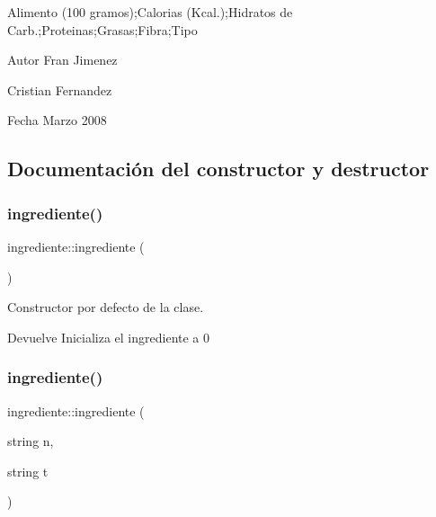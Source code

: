 Alimento (100 gramos);Calorias (Kcal.);Hidratos de Carb.;Proteinas;Grasas;Fibra;Tipo

\begin{DoxyAuthor}{Autor}
Fran Jimenez 

Cristian Fernandez 
\end{DoxyAuthor}
\begin{DoxyDate}{Fecha}
Marzo 2008 
\end{DoxyDate}


\subsection{Documentación del constructor y destructor}
\mbox{\label{classingrediente_a4f2c8e16106eb4cf5a8ad9695d7a3809}} 
\subsubsection{\texorpdfstring{ingrediente()}{ingrediente()}\hspace{0.1cm}{\footnotesize\ttfamily [1/3]}}
{\footnotesize\ttfamily ingrediente\+::ingrediente (\begin{DoxyParamCaption}{ }\end{DoxyParamCaption})}



Constructor por defecto de la clase. 

\begin{DoxyReturn}{Devuelve}
Inicializa el ingrediente a 0 
\end{DoxyReturn}
\mbox{\label{classingrediente_ac23e8df5d6df594b77de60b303e74652}} 
\subsubsection{\texorpdfstring{ingrediente()}{ingrediente()}\hspace{0.1cm}{\footnotesize\ttfamily [2/3]}}
{\footnotesize\ttfamily ingrediente\+::ingrediente (\begin{DoxyParamCaption}\item[{string}]{n,  }\item[{string}]{t }\end{DoxyParamCaption})}



